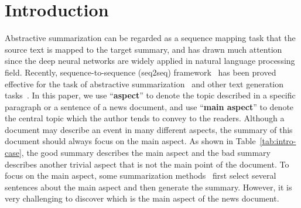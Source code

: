 \documentclass[letterpaper]{article}
\begin{document}
    \section{Introduction}

Abstractive summarization can be regarded as a sequence mapping task that the source text is mapped to the target summary, and has drawn much attention since the deep neural networks are widely applied in natural language processing field.
Recently, sequence-to-sequence (seq2seq) framework~\cite{Sutskever2014SequenceTS} has been proved effective for the task of abstractive summarization~\cite{Chopra2016AbstractiveSS,see2017get} and other text generation tasks~\cite{Tao2018GetTP,Gao2019Product}.
In this paper, we use ``\textbf{aspect}'' to denote the topic described in a specific paragraph or a sentence of a news document, and use ``\textbf{main aspect}'' to denote the central topic which the author tends to convey to the readers.
Although a document may describe an event in many different aspects, the summary of this document should always focus on the main aspect.
As shown in Table~\ref{tab:intro-case}, the good summary describes the main aspect and the bad summary describes another trivial aspect that is not the main point of the document.
To focus on the main aspect, some summarization methods~\cite{Sun2018AUM,Zhou2017SelectiveEF,Bansal2018FastAS} first select several sentences about the main aspect and then generate the summary.
However, it is very challenging to discover which is the main aspect of the news document.
\end{document}
